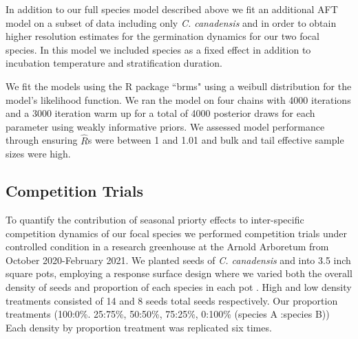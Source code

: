\documentclass{article}\usepackage[]{graphicx}\usepackage[]{color}
\begin{document}
In addition to our full species model described above we fit an additional AFT model on a subset of data including only \textit{C. canadensis} and in order to obtain higher resolution estimates for the germination dynamics for our two focal species. In this model we included species as a fixed effect in addition to incubation temperature and stratification duration. 

\noindent We fit the models using the R package ``brms" \citep{Burkner2018} using a weibull distribution for the model's likelihood function. We ran the model on four chains with 4000 iterations and a 3000 iteration warm up for a total of 4000 posterior draws for each parameter using weakly informative priors. We assessed  model performance through ensuring $\hat{R}$s were between 1 and 1.01 and bulk and tail effective sample sizes were high.

\subsection{Competition Trials}
\noindent To quantify the contribution of seasonal priorty effects to inter-specific competition dynamics of our focal species we performed competition trials under controlled condition in a research greenhouse at the Arnold Arboretum from October 2020-February 2021. We planted seeds of \textit{C. canadensis} and  into 3.5 inch square pots, employing a response surface design where we varied both the overall density of seeds and proportion of each species in each pot \citep{Inouye2001}. High and low density treatments consisted of 14 and 8 seeds total seeds respectively. Our proportion treatments (100:0\%. 25:75\%, 50:50\%, 75:25\%, 0:100\% (species A :species B)) Each density by proportion treatment was replicated six times. %
\end{document}
